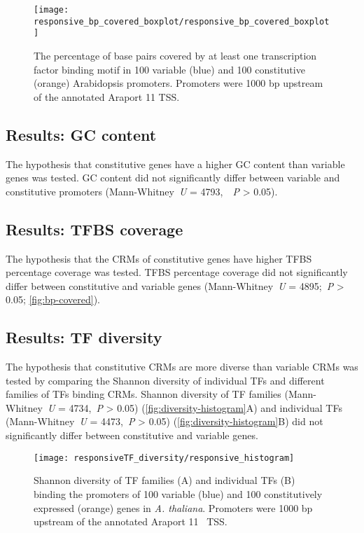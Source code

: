 \begin{figure}[!h]
	\begin{center}
		\capstart
		\texttt{[image: responsive\_bp\_covered\_boxplot/responsive\_bp\_covered\_boxplot]}
		\caption{
			The percentage of base pairs covered by at least one transcription
			factor binding motif in 100 variable (blue) and 100 constitutive
			(orange) Arabidopsis promoters. Promoters were 1000 bp upstream of the
			annotated Araport 11 \autocite{chengAraport11CompleteReannotation2017} TSS.
			\label{fig:bp-covered}
		}
	\end{center}
\end{figure}

\subsection{Results: GC content}
The hypothesis that constitutive genes have a higher GC content than variable genes was tested.
GC content did not significantly differ between variable and constitutive promoters (Mann\hyp{}Whitney~\textit{U} = 4793,~~\textit{P} \textgreater{} 0.05).

\subsection{Results: TFBS coverage}
The hypothesis that the CRMs of constitutive genes have higher TFBS percentage coverage was tested. TFBS percentage coverage did not significantly differ between constitutive and variable genes (Mann\hyp{}Whitney~\textit{U} = 4895;~\textit{P}
\textgreater{} 0.05; \autoref{fig:bp-covered}).

\subsection{Results: TF diversity}

The hypothesis that constitutive CRMs are more diverse than variable CRMs was tested by comparing the Shannon diversity of individual TFs and different families of TFs binding
CRMs. Shannon diversity of TF families (Mann\hyp{}Whitney~\textit{U} = 4734,~\textit{P} \textgreater{} 0.05) (\autoref{fig:diversity-histogram}A) and individual TFs (Mann\hyp{}Whitney~\textit{U} = 4473,~\textit{P} \textgreater{} 0.05) (\autoref{fig:diversity-histogram}B) did not significantly differ between constitutive and variable genes.

\begin{figure}[!h]
\begin{center}
\capstart
\texttt{[image: responsiveTF\_diversity/responsive\_histogram]}
\caption{Shannon diversity of TF families (A) and individual TFs (B) binding the promoters of 100 variable (blue) and 100 constitutively expressed (orange) genes in \textit{A. thaliana}. Promoters were 1000 bp upstream of the annotated Araport 11~\autocite{chengAraport11CompleteReannotation2017} TSS.
\label{fig:diversity-histogram}
}
\end{center}
\end{figure}


